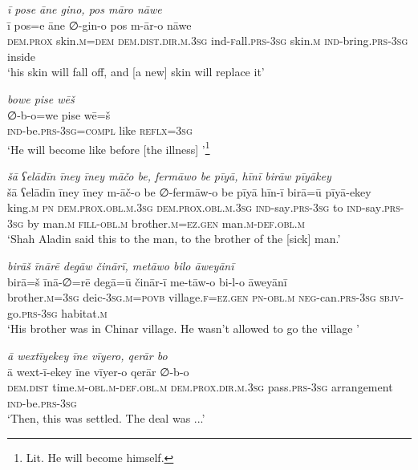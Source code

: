 \ea \label{DG.51}
\textit{ī pose āne gino, pos māro nāwe} \\ 
\gll ī pos=e āne ∅-gin-o pos m-ār-o nāwe \\ 
 \textsc{dem.prox} skin\textsc{.m}\textsc{=dem} \textsc{dem.dist}\textsc{.dir}\textsc{.m}\textsc{.3sg} ind\textsc{-f}all\textsc{.prs}\textsc{-3sg} skin\textsc{.m} \textsc{ind-}bring\textsc{.prs}\textsc{-3sg} inside \\ 
\glt `his skin will fall off, and [a new] skin will replace it'
\z 
 
\ea \label{DG.52}
\textit{bowe pise wēš} \\ 
\gll ∅-b-o=we pise wē=š \\ 
 \textsc{ind-}be\textsc{.prs}\textsc{-3sg}\textsc{=\textsc{compl}} like \textsc{reflx}\textsc{=3sg} \\ 
\glt `He will become like before [the illness] '\footnote{Lit. He will become himself.}
\z 
 
\ea \label{DG.53}
\textit{šā ʕelādīn īney īney māčo be, fermāwo be pīyā, hīnī birāw pīyākey} \\ 
\gll šā ʕelādīn īney īney m-āč-o be ∅-fermāw-o be pīyā hīn-ī birā=ū pīyā-ekey \\ 
 king\textsc{.m} \textsc{pn} \textsc{dem.prox}\textsc{.obl}\textsc{.m}\textsc{.3sg} \textsc{dem.prox}\textsc{.obl}\textsc{.m}\textsc{.3sg} \textsc{ind-}say\textsc{.prs}\textsc{-3sg} to \textsc{ind-}say\textsc{.prs}\textsc{-3sg} by man\textsc{.m} \textsc{fill}\textsc{-obl}\textsc{.m} brother\textsc{.m}\textsc{=ez}\textsc{.gen} man\textsc{.m}\textsc{-def}\textsc{.obl}\textsc{.m} \\ 
\glt `Shah Aladin said this to the man, to the brother of the [sick] man.'
\z 
 
\ea \label{DG.54}
\textit{birāš īnārē degāw činārī, metāwo bilo āweyānī} \\ 
\gll birā=š īnā-∅=rē degā=ū činār-ī me-tāw-o bi-l-o āweyānī \\ 
 brother\textsc{.m}\textsc{=3sg} deic\textsc{-3sg}\textsc{.m}\textsc{=\textsc{povb}} village\textsc{\textsc{.f}}\textsc{=ez}\textsc{.gen} \textsc{pn}\textsc{-obl}\textsc{.m} \textsc{neg-}can\textsc{.prs}\textsc{-3sg} \textsc{sbjv-}go\textsc{.prs}\textsc{-3sg} habitat\textsc{\textsc{.m}} \\ 
\glt `His brother was in Chinar village. He wasn’t allowed to go the village '
\z 
 
\ea \label{DG.55}
\textit{ā wextīyekey īne vīyero, qerār bo} \\ 
\gll ā wext-ī-ekey īne vīyer-o qerār ∅-b-o \\ 
 \textsc{dem.dist} time\textsc{.m}\textsc{-obl}\textsc{.m}\textsc{-def}\textsc{.obl}\textsc{.m} \textsc{dem.prox}\textsc{.dir}\textsc{.m}\textsc{.3sg} pass\textsc{.prs}\textsc{-3sg} arrangement \textsc{ind-}be\textsc{.prs}\textsc{-3sg} \\ 
\glt `Then, this was settled. The deal was ...'
\z 
 
